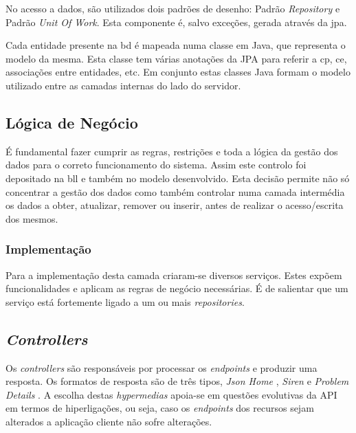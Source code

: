 No acesso a dados, são utilizados dois padrões de desenho: Padrão \textit{Repository} e Padrão \textit{Unit Of Work}. Esta componente é, salvo exceções, gerada através da \acrshort{jpa}.

Cada entidade presente na \acrshort{bd} é mapeada numa classe em Java, que representa o modelo da mesma. Esta classe tem várias anotações da JPA para referir a \acrlong{cp}, \acrlong{ce}, associações entre entidades, etc. Em conjunto estas classes Java formam o modelo utilizado entre as camadas internas do lado do servidor.

%
%
\subsection{Lógica de Negócio}\label{subsec422}

É fundamental fazer cumprir as regras, restrições e toda a lógica da gestão dos dados para o correto funcionamento do sistema. Assim  este controlo foi depositado na \acrfull{bll} e também no modelo desenvolvido. Esta decisão permite não só concentrar a gestão dos dados como também controlar numa camada intermédia os dados a obter, atualizar, remover ou inserir, antes de realizar o acesso/escrita dos mesmos. 

\subsubsection{Implementação}\label{subsubsec4221}

Para a implementação desta camada criaram-se diversos serviços. Estes expõem funcionalidades e aplicam as regras de negócio necessárias. É de salientar que um serviço está fortemente ligado a um ou mais \textit{repositories}.

%
%
\subsection{\textit{Controllers}}\label{subsec423}

Os \textit{controllers} são responsáveis por processar os \textit{endpoints} e produzir uma resposta. Os formatos de resposta são de três tipos, \textit{Json Home} \cite{draftnot72:jsonHome}, \textit{Siren} \cite{kevinswiber:siren} e \textit{Problem Details} \cite{RFC7807:problemDetails}. A escolha destas \textit{hypermedias} apoia-se em questões evolutivas da API em termos de hiperligações, ou seja, caso os \textit{endpoints} dos recursos sejam alterados a aplicação cliente não sofre alterações.

